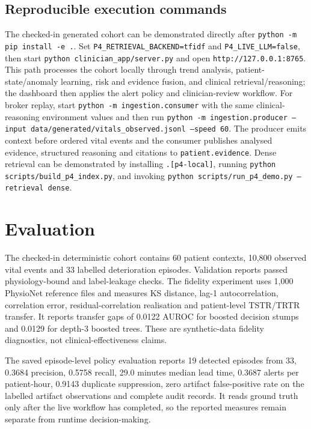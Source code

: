\documentclass[11pt,a4paper]{article}
\begin{document}
\subsection{Reproducible execution commands}
The checked-in generated cohort can be demonstrated directly after \texttt{python -m pip install -e .}. Set \texttt{P4\_RETRIEVAL\_BACKEND=tfidf} and \texttt{P4\_LIVE\_LLM=false}, then start \texttt{python clinician\_app/server.py} and open \texttt{http://127.0.0.1:8765}. This path processes the cohort locally through trend analysis, patient-state/anomaly learning, risk and evidence fusion, and clinical retrieval/reasoning; the dashboard then applies the alert policy and clinician-review workflow. For broker replay, start \texttt{python -m ingestion.consumer} with the same clinical-reasoning environment values and then run \texttt{python -m ingestion.producer --input data/generated/vitals\_observed.jsonl --speed 60}. The producer emits context before ordered vital events and the consumer publishes analysed evidence, structured reasoning and citations to \texttt{patient.evidence}. Dense retrieval can be demonstrated by installing \texttt{.[p4-local]}, running \texttt{python scripts/build\_p4\_index.py}, and invoking \texttt{python scripts/run\_p4\_demo.py --retrieval dense}.

\section{Evaluation}
The checked-in deterministic cohort contains 60 patient contexts, 10,800 observed vital events and 33 labelled deterioration episodes. Validation reports passed physiology-bound and label-leakage checks. The fidelity experiment uses 1,000 PhysioNet reference files and measures KS distance, lag-1 autocorrelation, correlation error, residual-correlation realisation and patient-level TSTR/TRTR transfer. It reports transfer gaps of 0.0122 AUROC for boosted decision stumps and 0.0129 for depth-3 boosted trees. These are synthetic-data fidelity diagnostics, not clinical-effectiveness claims.

The saved episode-level policy evaluation reports 19 detected episodes from 33, 0.3684 precision, 0.5758 recall, 29.0 minutes median lead time, 0.3687 alerts per patient-hour, 0.9143 duplicate suppression, zero artifact false-positive rate on the labelled artifact observations and complete audit records. It reads ground truth only after the live workflow has completed, so the reported measures remain separate from runtime decision-making.
\end{document}
